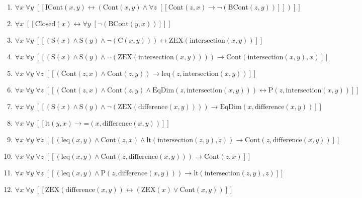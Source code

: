 \documentclass{article}
\begin{document}
\begin{enumerate}
\item $\forall x\; \forall y\;  \left[ \left[ \textrm{ICont}(x,y) \leftrightarrow \left(\textrm{Cont}(x,y) \land \forall z\;  \left[ \left[ \textrm{Cont}(z,x) \rightarrow \neg \left(\textrm{BCont}(z,y)\right) \right] \right]\right) \right] \right]$
\item $\forall x\;  \left[ \left[ \textrm{Closed}(x) \leftrightarrow \forall y\;  \left[ \neg \left(\textrm{BCont}(y,x)\right) \right] \right] \right]$
\item $\forall x\; \forall y\;  \left[ \left[ \left(\textrm{S}(x) \land \textrm{S}(y) \land \neg \left(\textrm{C}(x,y)\right)\right) \leftrightarrow \textrm{ZEX}(\textrm{intersection}(x,y)) \right] \right]$
\item $\forall x\; \forall y\;  \left[ \left[ \left(\textrm{S}(x) \land \textrm{S}(y) \land \neg \left(\textrm{ZEX}(\textrm{intersection}(x,y))\right)\right) \rightarrow \textrm{Cont}(\textrm{intersection}(x,y),x) \right] \right]$
\item $\forall x\; \forall y\; \forall z\;  \left[ \left[ \left(\textrm{Cont}(z,x) \land \textrm{Cont}(z,y)\right) \rightarrow \textrm{leq}(z,\textrm{intersection}(x,y)) \right] \right]$
\item $\forall x\; \forall y\; \forall z\;  \left[ \left[ \left(\textrm{Cont}(z,x) \land \textrm{Cont}(z,y) \land \textrm{EqDim}(z,\textrm{intersection}(x,y))\right) \leftrightarrow \textrm{P}(z,\textrm{intersection}(x,y)) \right] \right]$
\item $\forall x\; \forall y\;  \left[ \left[ \left(\textrm{S}(x) \land \textrm{S}(y) \land \neg \left(\textrm{ZEX}(\textrm{difference}(x,y))\right)\right) \rightarrow \textrm{EqDim}(x,\textrm{difference}(x,y)) \right] \right]$
\item $\forall x\; \forall y\;  \left[ \left[ \textrm{lt}(y,x) \rightarrow \textrm{=}(x,\textrm{difference}(x,y)) \right] \right]$
\item $\forall x\; \forall y\; \forall z\;  \left[ \left[ \left(\textrm{leq}(x,y) \land \textrm{Cont}(z,x) \land \textrm{lt}(\textrm{intersection}(z,y),z)\right) \rightarrow \textrm{Cont}(z,\textrm{difference}(x,y)) \right] \right]$
\item $\forall x\; \forall y\; \forall z\;  \left[ \left[ \left(\textrm{leq}(x,y) \land \textrm{Cont}(z,\textrm{difference}(x,y))\right) \rightarrow \textrm{Cont}(z,x) \right] \right]$
\item $\forall x\; \forall y\; \forall z\;  \left[ \left[ \left(\textrm{leq}(x,y) \land \textrm{P}(z,\textrm{difference}(x,y))\right) \rightarrow \textrm{lt}(\textrm{intersection}(z,y),z) \right] \right]$
\item $\forall x\; \forall y\;  \left[ \left[ \textrm{ZEX}(\textrm{difference}(x,y)) \leftrightarrow \left(\textrm{ZEX}(x) \lor \textrm{Cont}(x,y)\right) \right] \right]$
\end{enumerate}
\end{document}
